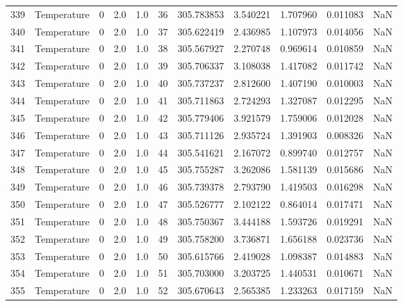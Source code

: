 \begin{tabular}{llrrrrrrrrr}
339 &  Temperature &       0 &  2.0 &  1.0 &   36 &  305.783853 &  3.540221 &  1.707960 &   0.011083 &      NaN \\
340 &  Temperature &       0 &  2.0 &  1.0 &   37 &  305.622419 &  2.436985 &  1.107973 &   0.014056 &      NaN \\
341 &  Temperature &       0 &  2.0 &  1.0 &   38 &  305.567927 &  2.270748 &  0.969614 &   0.010859 &      NaN \\
342 &  Temperature &       0 &  2.0 &  1.0 &   39 &  305.706337 &  3.108038 &  1.417082 &   0.011742 &      NaN \\
343 &  Temperature &       0 &  2.0 &  1.0 &   40 &  305.737237 &  2.812600 &  1.407190 &   0.010003 &      NaN \\
344 &  Temperature &       0 &  2.0 &  1.0 &   41 &  305.711863 &  2.724293 &  1.327087 &   0.012295 &      NaN \\
345 &  Temperature &       0 &  2.0 &  1.0 &   42 &  305.779406 &  3.921579 &  1.759006 &   0.012028 &      NaN \\
346 &  Temperature &       0 &  2.0 &  1.0 &   43 &  305.711126 &  2.935724 &  1.391903 &   0.008326 &      NaN \\
347 &  Temperature &       0 &  2.0 &  1.0 &   44 &  305.541621 &  2.167072 &  0.899740 &   0.012757 &      NaN \\
348 &  Temperature &       0 &  2.0 &  1.0 &   45 &  305.755287 &  3.262086 &  1.581139 &   0.015686 &      NaN \\
349 &  Temperature &       0 &  2.0 &  1.0 &   46 &  305.739378 &  2.793790 &  1.419503 &   0.016298 &      NaN \\
350 &  Temperature &       0 &  2.0 &  1.0 &   47 &  305.526777 &  2.102122 &  0.864014 &   0.017471 &      NaN \\
351 &  Temperature &       0 &  2.0 &  1.0 &   48 &  305.750367 &  3.444188 &  1.593726 &   0.019291 &      NaN \\
352 &  Temperature &       0 &  2.0 &  1.0 &   49 &  305.758200 &  3.736871 &  1.656188 &   0.023736 &      NaN \\
353 &  Temperature &       0 &  2.0 &  1.0 &   50 &  305.615766 &  2.419028 &  1.098387 &   0.014883 &      NaN \\
354 &  Temperature &       0 &  2.0 &  1.0 &   51 &  305.703000 &  3.203725 &  1.440531 &   0.010671 &      NaN \\
355 &  Temperature &       0 &  2.0 &  1.0 &   52 &  305.670643 &  2.565385 &  1.233263 &   0.017159 &      NaN \\

\end{tabular}
